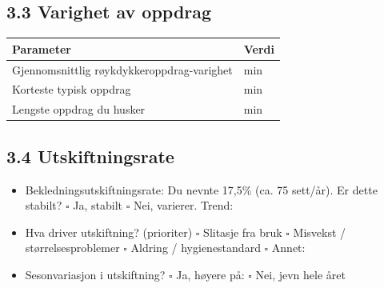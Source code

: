 \documentclass[12pt, a4paper, norsk]{article}
\begin{document}
\subsection*{3.3 Varighet av oppdrag}

\vspace{0.3cm}

\begin{center}
\begin{tabular}{|l|l|}
\hline
\textbf{Parameter} & \textbf{Verdi} \\
\hline
Gjennomsnittlig røykdykkeroppdrag-varighet & \underline{\hspace{5cm}} min \\
\hline
Korteste typisk oppdrag & \underline{\hspace{5cm}} min \\
\hline
Lengste oppdrag du husker & \underline{\hspace{5cm}} min \\
\hline
\end{tabular}
\end{center}

\subsection*{3.4 Utskiftningsrate}

\vspace{0.3cm}

\begin{itemize}
\item[\textbf{Q:}] Bekledningsutskiftningsrate: Du nevnte 17,5\% (ca. 75 sett/år). Er dette stabilt?
  \newline $\square$ Ja, stabilt \quad $\square$ Nei, varierer. Trend: \underline{\hspace{6cm}}

\item[\textbf{Q:}] Hva driver utskiftning? (prioriter)
  \newline $\square$ Slitasje fra bruk
  \newline $\square$ Misvekst / størrelsesproblemer
  \newline $\square$ Aldring / hygienestandard
  \newline $\square$ Annet: \underline{\hspace{8cm}}

\item[\textbf{Q:}] Sesonvariasjon i utskiftning?
  \newline $\square$ Ja, høyere på: \underline{\hspace{6cm}}
  \newline $\square$ Nei, jevn hele året
\end{itemize}
\end{document}
